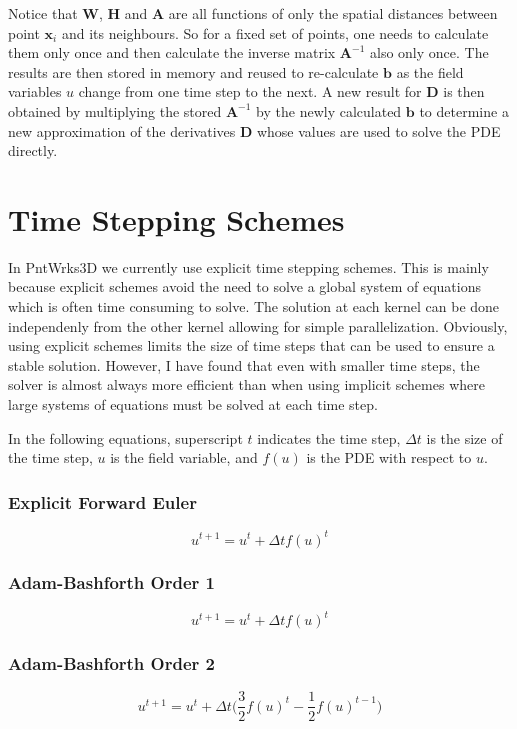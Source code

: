 \documentclass[12pt]{extarticle}
\begin{document}
Notice that $\textbf{W}$, $\textbf{H}$ and $\textbf{A}$ are all functions of only the spatial distances between point $\textbf{x}_{i}$ and its neighbours. So for a fixed set of points, one needs to calculate them only once and then calculate the inverse matrix $\textbf{A}^{-1}$ also only once. The results are then stored in memory and reused to re-calculate $\textbf{b}$ as the field variables $u$ change from one time step to the next. A new result for $\textbf{D}$ is then obtained by multiplying the stored $\textbf{A}^{-1}$ by the newly calculated $\textbf{b}$ to determine a new approximation of the derivatives $\textbf{D}$ whose values are used to solve the PDE directly.

\section{Time Stepping Schemes}
In PntWrks3D we currently use explicit time stepping schemes. This is mainly because explicit schemes avoid the need to solve a global system of equations which is often time consuming to solve. The solution at each kernel can be done independenly from the other kernel allowing for simple parallelization. Obviously, using explicit schemes limits the size of time steps that can be used to ensure a stable solution. However, I have found that even with smaller time steps, the solver is almost always more efficient than when using implicit schemes where large systems of equations must be solved at each time step. 

\vspace{5}
In the following equations, superscript $t$ indicates the time step, $\Delta t$ is the size of the time step, $u$ is the field variable, and $f(u)$ is the PDE with respect to $u$.

\subsubsection*{Explicit Forward Euler}
\begin{equation}
u^{t+1}=u^{t}+\Delta t f(u)^{t}
\end{equation}
\subsubsection*{Adam-Bashforth Order 1}
\begin{equation}
u^{t+1}=u^{t}+\Delta t f(u)^{t}
\end{equation}
\subsubsection*{Adam-Bashforth Order 2}
\begin{equation}
u^{t+1}=u^{t}+\Delta t \Big ( \frac{3}{2} f(u)^{t} - \frac{1}{2} f(u)^{t-1} \Big)
\end{equation}
\end{document}
